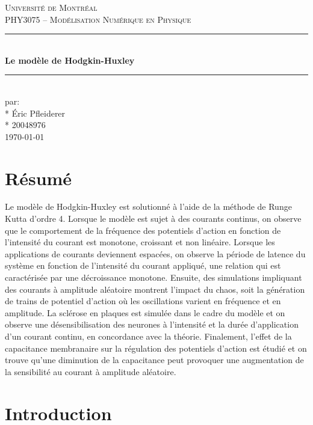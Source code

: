\documentclass{article}
\begin{document}
	
\begin{titlepage}
	\center
	\vspace*{2cm}
	\textsc{\LARGE Université de Montréal}\\[1cm] 
	\textsc{\Large PHY3075 -- Modélisation Numérique en Physique}\\[3cm] %
	\rule{\linewidth}{0.5mm} \\[0.5cm]
	{\LARGE \bfseries Le modèle de Hodgkin-Huxley} \\[0.2cm] %
	\rule{\linewidth}{0.5mm} \\[3cm]
	\large par: \\*
	Éric Pfleiderer \\* 
	20048976\\[3cm] 
	{\large \today}\\[3cm]
	\vfill
\end{titlepage}

\section{Résumé}\label{sec:resume}

Le modèle de Hodgkin-Huxley est solutionné à l'aide de la méthode de Runge Kutta d'ordre 4. 
Lorsque le modèle est sujet à des courants continus, on observe que le comportement de la fréquence des potentiels d'action en fonction de l'intensité du courant est monotone, croissant et non linéaire. Lorsque les applications de courants deviennent espacées, on observe la période de latence du système en fonction de l'intensité du courant appliqué, une relation qui est caractérisée par une décroissance monotone. Ensuite, des simulations impliquant des courants à amplitude aléatoire montrent l'impact du chaos, soit la génération de trains de potentiel d'action où les oscillations varient en fréquence et en amplitude. La sclérose en plaques est simulée dans le cadre du modèle et on observe une désensibilisation des neurones à l'intensité et la durée d'application d'un courant continu, en concordance avec la théorie. Finalement, l'effet de la capacitance membranaire sur la régulation des potentiels d'action est étudié et on trouve qu'une diminution de la capacitance peut provoquer une augmentation de la sensibilité au courant à amplitude aléatoire.

\section{Introduction}\label{sec:introduction}
\end{document}

